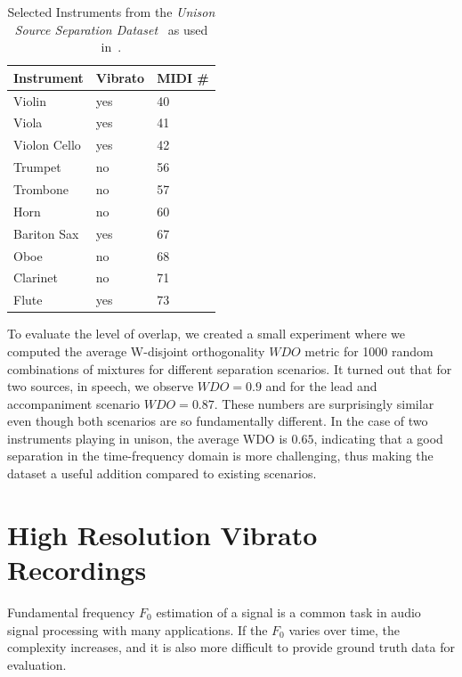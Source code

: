 \begin{table}
\begin{center}
\footnotesize
\begin{tabular}{ l l l}
  \toprule
  Instrument & Vibrato &  MIDI \# \\
  \midrule
  Violin & yes & 40 \\
  Viola & yes & 41 \\
  Violon Cello & yes & 42 \\
  Trumpet & no & 56 \\
  Trombone & no & 57\\
  Horn & no & 60  \\
  Bariton Sax & yes & 67 \\
  Oboe & no & 68\\
  Clarinet & no & 71\\
  Flute & yes & 73\\
  \bottomrule
\end{tabular}
\end{center}
\caption{Selected Instruments from the \emph{Unison Source Separation Dataset}~\cite{oss_unison} as used in~\cite{stoeter14, stoeter16}.}
\label{tab:testset}
\end{table}

To evaluate the level of overlap, we created a small experiment where we computed the average W-disjoint orthogonality \(WDO\) metric for 1000 random combinations of mixtures for different separation scenarios.
It turned out that for two sources, in speech, we observe \(WDO=0.9\) and for the lead and accompaniment scenario \(WDO=0.87\). 
These numbers are surprisingly similar even though both scenarios are so fundamentally different.
In the case of two instruments playing in unison, the average WDO is \(0.65\), indicating that a good separation in the time-frequency domain is more challenging, thus making the dataset a useful addition compared to existing scenarios.

\section{High Resolution Vibrato Recordings}%
\label{sec:muserc}


Fundamental frequency \(F_0\) estimation of a signal is a common task in audio signal processing with many applications. 
If the $F_0$ varies over time, the complexity increases, and it is also more difficult to provide ground truth data for evaluation.

